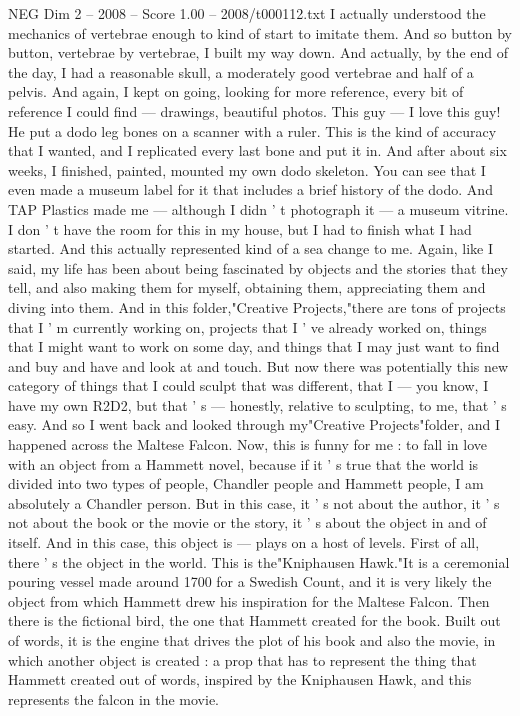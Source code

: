\begin{textsample}{NEG Dim 2 – 2008 – Score 1.00 – 2008/t000112.txt}
I actually understood the mechanics of vertebrae enough to kind of start to imitate them.
And so button by button, vertebrae by vertebrae, I built my way down.
And actually, by the end of the day, I had a reasonable skull, a moderately good vertebrae and half of a pelvis.
And again, I kept on going, looking for more reference, every bit of reference I could find — drawings, beautiful photos.
This guy — I love this guy!
He put a dodo leg bones on a scanner with a ruler.
This is the kind of accuracy that I wanted, and I replicated every last bone and put it in.
And after about six weeks, I finished, painted, mounted my own dodo skeleton.
You can see that I even made a museum label for it that includes a brief history of the dodo.
And TAP Plastics made me — although I didn ' t photograph it — a museum vitrine.
I don ' t have the room for this in my house, but I had to finish what I had started.
And this actually represented kind of a sea change to me.
Again, like I said, my life has been about being fascinated by objects and the stories that they tell, and also making them for myself, obtaining them, appreciating them and diving into them.
And in this folder,"Creative Projects,"there are tons of projects that I ' m currently working on, projects that I ' ve already worked on, things that I might want to work on some day, and things that I may just want to find and buy and have and look at and touch.
But now there was potentially this new category of things that I could sculpt that was different, that I — you know, I have my own R2D2, but that ' s — honestly, relative to sculpting, to me, that ' s easy.
And so I went back and looked through my"Creative Projects"folder, and I happened across the Maltese Falcon.
Now, this is funny for me : to fall in love with an object from a Hammett novel, because if it ' s true that the world is divided into two types of people, Chandler people and Hammett people, I am absolutely a Chandler person.
But in this case, it ' s not about the author, it ' s not about the book or the movie or the story, it ' s about the object in and of itself.
And in this case, this object is — plays on a host of levels.
First of all, there ' s the object in the world.
This is the"Kniphausen Hawk."It is a ceremonial pouring vessel made around 1700 for a Swedish Count, and it is very likely the object from which Hammett drew his inspiration for the Maltese Falcon.
Then there is the fictional bird, the one that Hammett created for the book.
Built out of words, it is the engine that drives the plot of his book and also the movie, in which another object is created : a prop that has to represent the thing that Hammett created out of words, inspired by the Kniphausen Hawk, and this represents the falcon in the movie.

\end{textsample}
